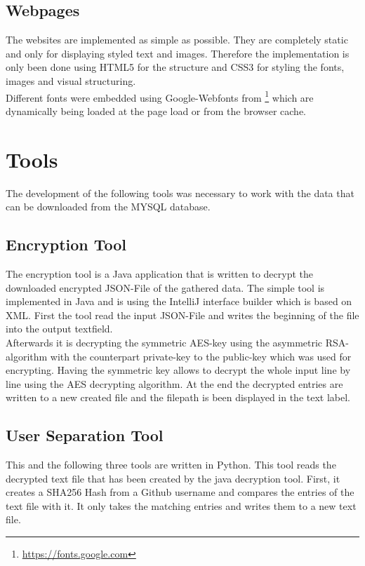 \subsection{Webpages}
The websites are implemented as simple as possible. They are completely static and only for displaying styled text and images. Therefore the implementation is only been done using HTML5 for the structure and CSS3 for styling the fonts, images and visual structuring.\\
Different fonts were embedded using Google-Webfonts from \footnote{\url{https://fonts.google.com}} which are dynamically being loaded at the page load or from the browser cache. 

\section{Tools}
The development of the following tools was necessary to work with the data that can be downloaded from the MYSQL database.

\subsection{Encryption Tool}
The encryption tool is a Java application that is written to decrypt the downloaded encrypted JSON-File of the gathered data.
The simple tool is implemented in Java and is using the IntelliJ interface builder which is based on XML. 
First the tool read the input JSON-File and writes the beginning of the file into the output textfield.\\
Afterwards it is decrypting the symmetric AES-key using the asymmetric RSA-algorithm with the counterpart private-key to the public-key which was used for encrypting. Having the symmetric key allows to decrypt the whole input line by line using the AES decrypting algorithm.
At the end the decrypted entries are written to a new created file and the filepath is been displayed in the text label. 

\subsection{User Separation Tool}
This and the following three tools are written in Python. This tool reads the decrypted text file that has been created by the java decryption tool. First, it creates a SHA256 Hash from a Github username and compares the entries of the text file with it. It only takes the matching entries and writes them to a new text file. 

